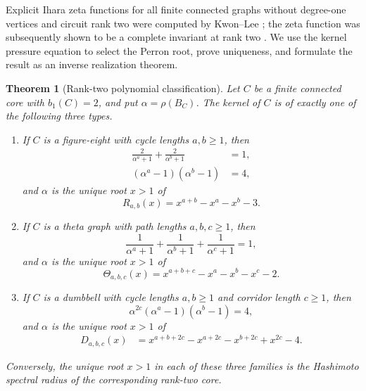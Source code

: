 \documentclass[11pt]{amsart}
\theoremstyle{plain}
\newtheorem{theorem}{Theorem}[section]
\theoremstyle{definition}
\theoremstyle{remark}
\begin{document}
Explicit Ihara zeta functions for all finite connected graphs without
degree-one vertices and circuit rank two were computed by Kwon--Lee
\cite{KwonLee2020}; the zeta function was subsequently shown to be a complete
invariant at rank two \cite{ChicoMattmanRichards2025}.  We use the kernel
pressure equation to select the Perron root, prove uniqueness, and formulate
the result as an inverse realization theorem.

\begin{theorem}[Rank-two polynomial classification]
\label{thm:rank-two-polynomials}
Let \(C\) be a finite connected core with \(b_1(C)=2\), and put
\(\alpha=\rho(B_C)\).  The kernel of \(C\) is of exactly one of the following
three types.
\begin{enumerate}[label=\textup{(\roman*)}]
  \item If \(C\) is a figure-eight with cycle lengths \(a,b\geq1\), then
  \begin{align}
    \frac{2}{\alpha^a+1}+\frac{2}{\alpha^b+1}&=1,
      \label{eq:figure-eight-pressure}\\
    (\alpha^a-1)(\alpha^b-1)&=4,                \label{eq:figure-eight-product}
  \end{align}
  and \(\alpha\) is the unique root \(x>1\) of
  \begin{equation}\label{eq:figure-eight-polynomial}
    R_{a,b}(x)=x^{a+b}-x^a-x^b-3.
  \end{equation}

  \item If \(C\) is a theta graph with path lengths \(a,b,c\geq1\), then
  \begin{equation}\label{eq:theta-pressure}
    \frac{1}{\alpha^a+1}
    +\frac{1}{\alpha^b+1}
    +\frac{1}{\alpha^c+1}=1,
  \end{equation}
  and \(\alpha\) is the unique root \(x>1\) of
  \begin{equation}\label{eq:theta-polynomial}
    \Theta_{a,b,c}(x)
    =x^{a+b+c}-x^a-x^b-x^c-2.
  \end{equation}

  \item If \(C\) is a dumbbell with cycle lengths \(a,b\geq1\) and corridor
  length \(c\geq1\), then
  \begin{equation}\label{eq:dumbbell-pressure}
    \alpha^{2c}(\alpha^a-1)(\alpha^b-1)=4,
  \end{equation}
  and \(\alpha\) is the unique root \(x>1\) of
  \begin{align}
    D_{a,b,c}(x)
    &=
    x^{a+b+2c}-x^{a+2c}-x^{b+2c}+x^{2c}-4.
    \label{eq:dumbbell-polynomial}
  \end{align}
\end{enumerate}
Conversely, the unique root \(x>1\) in each of these three families is the
Hashimoto spectral radius of the corresponding rank-two core.
\end{theorem}
\end{document}
